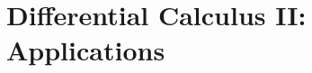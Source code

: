 \documentclass[../../main.tex]{subfiles}
\begin{document}
\chapter{Differential Calculus II: Applications}
\end{document}

